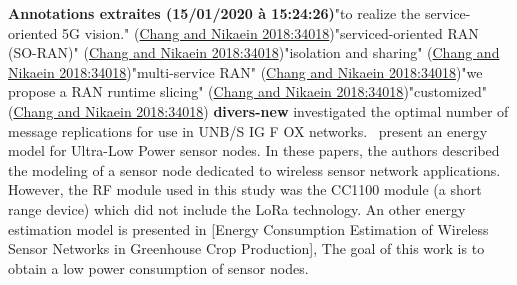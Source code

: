  \cite{chang_ran_2018}   \textbf{Annotations extraites (15/01/2020 \`a 15:24:26)}"to realize the service-oriented 5G vision." (\href{zotero://open-pdf/library/items/57RV85XB?page=1}{Chang and Nikaein 2018:34018})"serviced-oriented RAN (SO-RAN)" (\href{zotero://open-pdf/library/items/57RV85XB?page=1}{Chang and Nikaein 2018:34018})"isolation and sharing" (\href{zotero://open-pdf/library/items/57RV85XB?page=1}{Chang and Nikaein 2018:34018})"multi-service RAN" (\href{zotero://open-pdf/library/items/57RV85XB?page=1}{Chang and Nikaein 2018:34018})"we propose a RAN runtime slicing" (\href{zotero://open-pdf/library/items/57RV85XB?page=1}{Chang and Nikaein 2018:34018})"customized" (\href{zotero://open-pdf/library/items/57RV85XB?page=1}{Chang and Nikaein 2018:34018})   \newline 
\textbf{divers-new} \newline  \cite{mo_optimization_2016}   \citet{mo_optimization_2016} investigated the optimal number of message replications for use in UNB/S IG F OX networks.~   \newline 
 \cite{terrasson_system_2014}   \citet{terrasson_system_2014} present an energy model for Ultra-Low Power sensor nodes. In these papers, the authors described the modeling of a sensor node dedicated to wireless sensor network applications. However, the RF module used in this study was the CC1100 module (a short range device) which did not include the LoRa technology. An other energy estimation model is presented in [Energy Consumption Estimation of Wireless Sensor Networks in Greenhouse Crop Production], The goal of this work is to obtain a low power consumption of sensor nodes.~   \newline 
 \cite{aguilar_opportunistic_2017}    \newline 
 \cite{alonso_middleware_2018}    \newline 
 \cite{bari_multi-attribute_2007}    \newline 
 \cite{boutaba_comprehensive_2018}    \newline 
 \cite{cardell-oliver_error_2012}    \newline 
 \cite{gan_genetic_2009}    \newline 
 \cite{jabbarpour_applications_2018}    \newline 
 \cite{joshi_artificial_2017}    \newline 
 \cite{juma_cooperative_nodate}    \newline 
 \cite{kempa_transient_2018}    \newline 
 \cite{li_equilibrium_2016}    \newline 
